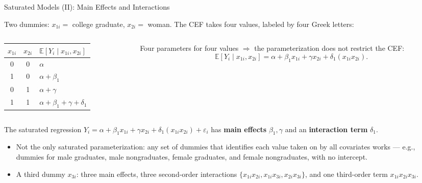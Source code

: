 \documentclass[aspectratio=169,11pt]{beamer}
\newcommand{\E}{\mathbb{E}}
\begin{document}
\begin{frame}{Saturated Models (II): Main Effects and Interactions}
\small

Two dummies: $x_{1i}=$ college graduate, $x_{2i}=$ woman. The CEF takes four
values, labeled by four Greek letters:

\begin{columns}[T]
\begin{column}{0.47\textwidth}
\renewcommand{\arraystretch}{1.25}
\begin{tabular}{@{}ccl@{}}
\toprule
$x_{1i}$ & $x_{2i}$ & $\E[Y_i\mid x_{1i},x_{2i}]$ \\
\midrule
0 & 0 & $\alpha$ \\
1 & 0 & $\alpha+\beta_1$ \\
0 & 1 & $\alpha+\gamma$ \\
1 & 1 & $\alpha+\beta_1+\gamma+\delta_1$ \\
\bottomrule
\end{tabular}
\end{column}
\begin{column}{0.51\textwidth}
Four parameters for four values $\Rightarrow$ the parameterization does
\alert{not} restrict the CEF:
\[
\E[Y_i\mid x_{1i},x_{2i}]
= \alpha+\beta_1x_{1i}+\gamma x_{2i}+\delta_1(x_{1i}x_{2i}).
\]
\end{column}
\end{columns}

\smallskip

The saturated regression
$Y_i = \alpha+\beta_1x_{1i}+\gamma x_{2i}+\delta_1(x_{1i}x_{2i})+\varepsilon_i$
has \textbf{main effects} $\beta_1,\gamma$ and an \textbf{interaction term}
$\delta_1$.

\begin{itemize}
    \item Not the only saturated parameterization: any set of dummies that
    identifies each value taken on by all covariates works --- e.g., dummies
    for male graduates, male nongraduates, female graduates, and female
    nongraduates, with no intercept.
    \item A third dummy $x_{3i}$: three main effects, three second-order
    interactions $\{x_{1i}x_{2i},x_{1i}x_{3i},x_{2i}x_{3i}\}$, and one
    third-order term $x_{1i}x_{2i}x_{3i}$.
\end{itemize}

\end{frame}
\end{document}
